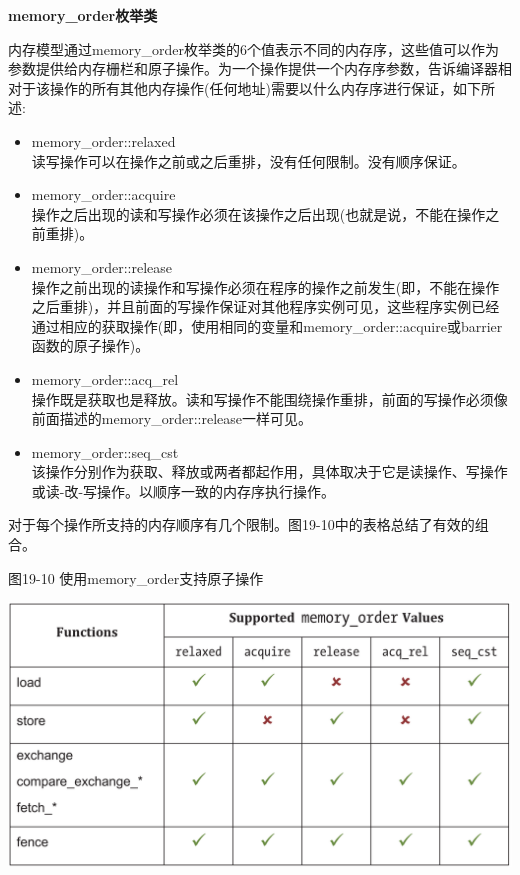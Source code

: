 \hspace*{\fill} \par %
\textbf{memory\_order枚举类}

内存模型通过memory\_order枚举类的6个值表示不同的内存序，这些值可以作为参数提供给内存栅栏和原子操作。为一个操作提供一个内存序参数，告诉编译器相对于该操作的所有其他内存操作(任何地址)需要以什么内存序进行保证，如下所述:\par

\begin{itemize}
	\item memory\_order::relaxed \\
	读写操作可以在操作之前或之后重排，没有任何限制。没有顺序保证。
	\item memory\_order::acquire \\
	操作之后出现的读和写操作必须在该操作之后出现(也就是说，不能在操作之前重排)。
	\item memory\_order::release \\ 
	操作之前出现的读操作和写操作必须在程序的操作之前发生(即，不能在操作之后重排)，并且前面的写操作保证对其他程序实例可见，这些程序实例已经通过相应的获取操作(即，使用相同的变量和memory\_order::acquire或barrier函数的原子操作)。
	\item memory\_order::acq\_rel \\
	操作既是获取也是释放。读和写操作不能围绕操作重排，前面的写操作必须像前面描述的memory\_order::release一样可见。
	\item memory\_order::seq\_cst \\
	该操作分别作为获取、释放或两者都起作用，具体取决于它是读操作、写操作或读-改-写操作。以顺序一致的内存序执行操作。
\end{itemize}

对于每个操作所支持的内存顺序有几个限制。图19-10中的表格总结了有效的组合。\par

\hspace*{\fill} \par %
图19-10 使用memory\_order支持原子操作
\begin{center}
	\includegraphics[width=1.0\textwidth]{content/chapter-19/images/8}
\end{center}

